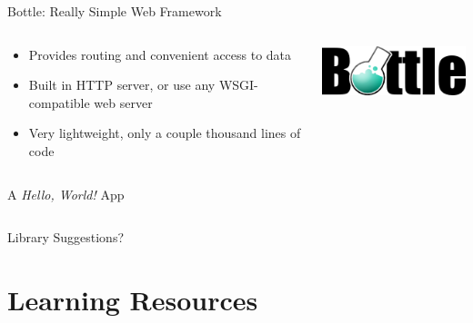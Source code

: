 \documentclass{lug}
\begin{document}
\begin{frame}{Bottle: Really Simple Web Framework}
    \begin{columns}
        \begin{column}{0.7\linewidth}
            \begin{itemize}[<+->]
                \item Provides routing and convenient access to data
                \item Built in HTTP server, or use any WSGI-compatible web
                    server
                \item Very lightweight, only a couple thousand lines of code
            \end{itemize}
        \end{column}
        \begin{column}{0.3\linewidth}
            \includegraphics[width=\linewidth]{graphics/bottle}
        \end{column}
    \end{columns}

    \pause[\thebeamerpauses]
    \bigskip

    \begin{block}{A \emph{Hello, World!} App}
        \begin{minipage}{\linewidth}
            \tiny
            \inputminted{python3}{examples/bottle_ex.py}
        \end{minipage}
    \end{block}
\end{frame}

\begin{frame}[standout]
    \Huge
    Library Suggestions?
\end{frame}

\section{Learning Resources}
\end{document}
